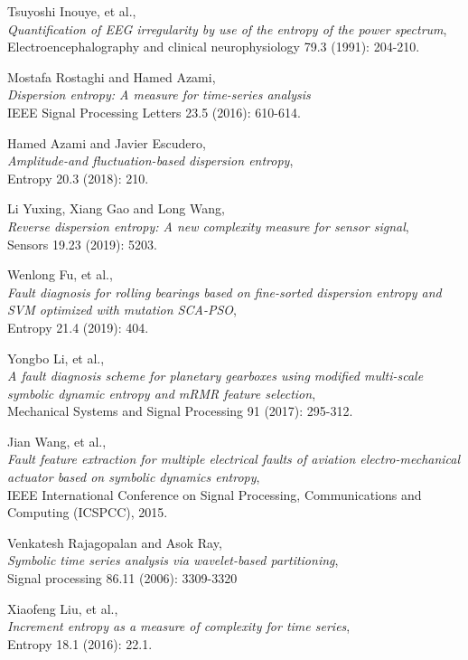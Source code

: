 \documentclass[12pt, a4paper, titlepage, openany]{book}
\begin{document}
\begin{thebibliography}{9}
Tsuyoshi Inouye, et al.,\\
\emph{Quantification of EEG irregularity by use of the entropy of the power spectrum},\\
Electroencephalography and clinical neurophysiology 79.3 (1991): 204-210.

Mostafa Rostaghi and Hamed Azami,\\
\emph{Dispersion entropy: A measure for time-series analysis}\\
IEEE Signal Processing Letters 23.5 (2016): 610-614.
 
Hamed Azami and Javier Escudero,\\
\emph{Amplitude-and fluctuation-based dispersion entropy},\\
Entropy 20.3 (2018): 210.
 
Li Yuxing, Xiang Gao and Long Wang,\\
\emph{Reverse dispersion entropy: A new complexity measure for sensor signal},\\
Sensors 19.23 (2019): 5203.
 
Wenlong Fu, et al.,\\
\emph{Fault diagnosis for rolling bearings based on fine-sorted dispersion entropy and SVM optimized with mutation SCA-PSO},\\
Entropy 21.4 (2019): 404.

Yongbo Li, et al.,\\
\emph{A fault diagnosis scheme for planetary gearboxes using modified multi-scale symbolic dynamic entropy and mRMR feature selection},\\
Mechanical Systems and Signal Processing 91 (2017): 295-312. 
 
Jian Wang, et al.,\\
\emph{Fault feature extraction for multiple electrical faults of aviation electro-mechanical actuator based on symbolic dynamics entropy},\\
IEEE International Conference on Signal Processing, Communications and Computing (ICSPCC), 2015.
 
Venkatesh Rajagopalan and Asok Ray,\\
\emph{Symbolic time series analysis via wavelet-based partitioning},\\
Signal processing 86.11 (2006): 3309-3320

Xiaofeng Liu, et al.,\\
\emph{Increment entropy as a measure of complexity for time series},\\
Entropy 18.1 (2016): 22.1.


\end{thebibliography}
\end{document}
